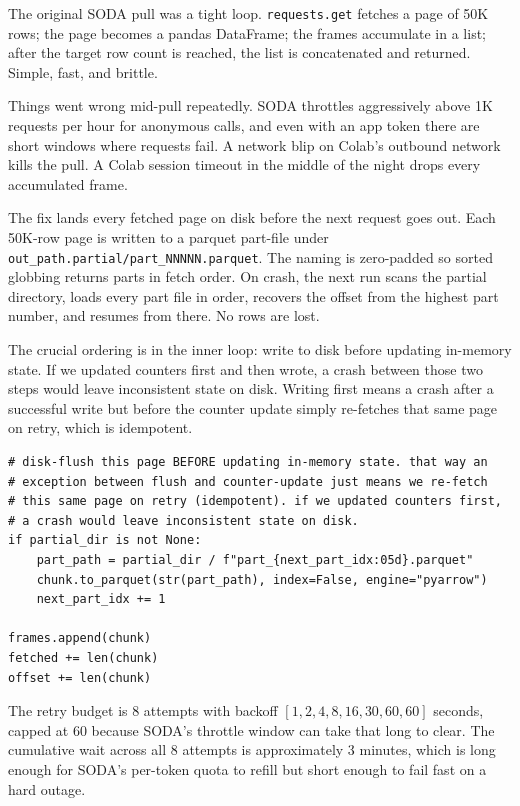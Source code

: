 \documentclass[11pt,letterpaper]{book}
\begin{document}
The original SODA pull was a tight loop. \texttt{requests.get} fetches a page of 50K rows; the page becomes a pandas DataFrame; the frames accumulate in a list; after the target row count is reached, the list is concatenated and returned. Simple, fast, and brittle.

Things went wrong mid-pull repeatedly. SODA throttles aggressively above 1K requests per hour for anonymous calls, and even with an app token there are short windows where requests fail. A network blip on Colab's outbound network kills the pull. A Colab session timeout in the middle of the night drops every accumulated frame.

The fix lands every fetched page on disk before the next request goes out. Each 50K-row page is written to a parquet part-file under \texttt{out\_path.partial/part\_NNNNN.parquet}. The naming is zero-padded so sorted globbing returns parts in fetch order. On crash, the next run scans the partial directory, loads every part file in order, recovers the offset from the highest part number, and resumes from there. No rows are lost.

The crucial ordering is in the inner loop: write to disk before updating in-memory state. If we updated counters first and then wrote, a crash between those two steps would leave inconsistent state on disk. Writing first means a crash after a successful write but before the counter update simply re-fetches that same page on retry, which is idempotent.

\begin{lstlisting}
# disk-flush this page BEFORE updating in-memory state. that way an
# exception between flush and counter-update just means we re-fetch
# this same page on retry (idempotent). if we updated counters first,
# a crash would leave inconsistent state on disk.
if partial_dir is not None:
    part_path = partial_dir / f"part_{next_part_idx:05d}.parquet"
    chunk.to_parquet(str(part_path), index=False, engine="pyarrow")
    next_part_idx += 1

frames.append(chunk)
fetched += len(chunk)
offset += len(chunk)
\end{lstlisting}

The retry budget is 8 attempts with backoff $[1, 2, 4, 8, 16, 30, 60, 60]$ seconds, capped at 60 because SODA's throttle window can take that long to clear. The cumulative wait across all 8 attempts is approximately 3 minutes, which is long enough for SODA's per-token quota to refill but short enough to fail fast on a hard outage.
\end{document}
